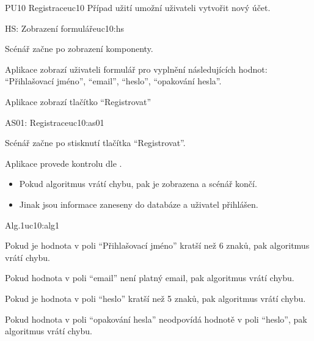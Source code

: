 \begin{usecase}{PU10 Registrace}{uc10}
    Případ užití umožní uživateli vytvořit nový účet.

    \begin{scenario}{HS: Zobrazení formuláře}{uc10:hs}
        \item Scénář začne po zobrazení komponenty.
        \item Aplikace zobrazí uživateli formulář pro vyplnění následujících hodnot: \enquote{Přihlašovací jméno}, \enquote{email}, \enquote{heslo}, \enquote{opakování hesla}.
        \item Aplikace zobrazí tlačítko \enquote{Registrovat}
    \end{scenario}

    \begin{scenario}{AS01: Registrace}{uc10:as01}
        \item Scénář začne po stisknutí tlačítka \enquote{Registrovat}.
        \item Aplikace provede kontrolu dle .
        \begin{itemize}
            \item Pokud algoritmus vrátí chybu, pak je zobrazena a scénář končí.
            \item Jinak jsou informace zaneseny do databáze a uživatel přihlášen.
        \end{itemize}
    \end{scenario}

    \begin{scenario}{Alg.1}{uc10:alg1}
        \item Pokud je hodnota v poli \enquote{Přihlašovací jméno} kratší než 6 znaků, pak algoritmus vrátí chybu.
        \item Pokud hodnota v poli \enquote{email} není platný email, pak algoritmus vrátí chybu.
        \item Pokud je hodnota v poli \enquote{heslo} kratší než 5 znaků, pak algoritmus vrátí chybu.
        \item Pokud hodnota v poli \enquote{opakování hesla} neodpovídá hodnotě v poli \enquote{heslo}, pak algoritmus vrátí chybu.
    \end{scenario}
\end{usecase}